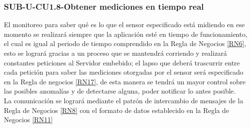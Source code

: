 \subsubsection{SUB-U-CU1.8-Obtener mediciones en tiempo real}\label{SUB-U-CU1.8}
El monitoreo para saber qué es lo que el sensor especificado está midiendo en ese momento se realizará siempre que la aplicación esté en tiempo de funcionamiento, el cual es igual al periodo de tiempo comprendido en la Regla de Negocios \ref{RN6}, esto se logrará gracias a un proceso que se mantendrá corriendo y realizará constantes peticiones al Servidor embebido; el lapso que deberá trascurrir entre cada petición para saber las mediciones otorgadas por el sensor será especificado en la Regla de negocios \ref{RN17}, de esta manera se tendrá un mayor control sobre las posibles anomalías y de detectarse alguna, poder notificar lo antes posible.
\\ La comunicación se logrará mediante el patrón de intercambio de mensajes de la Regla de Negocios \ref{RN8} con el formato de datos establecido en la Regla de Negocios \ref{RN11}  


